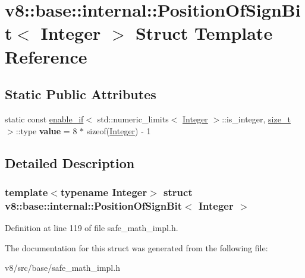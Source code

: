 \hypertarget{structv8_1_1base_1_1internal_1_1PositionOfSignBit}{}\section{v8\+:\+:base\+:\+:internal\+:\+:Position\+Of\+Sign\+Bit$<$ Integer $>$ Struct Template Reference}
\label{structv8_1_1base_1_1internal_1_1PositionOfSignBit}
\subsection*{Static Public Attributes}
\begin{DoxyCompactItemize}
\item 
\mbox{\label{structv8_1_1base_1_1internal_1_1PositionOfSignBit_ad29cf67660b8ffa1b8cc09181a5c779c}} 
static const \mbox{\hyperlink{structv8_1_1base_1_1internal_1_1enable__if}{enable\+\_\+if}}$<$ std\+::numeric\+\_\+limits$<$ \mbox{\hyperlink{classv8_1_1Integer}{Integer}} $>$\+::is\+\_\+integer, \mbox{\hyperlink{classsize__t}{size\+\_\+t}} $>$\+::type {\bfseries value} = 8 $\ast$ sizeof(\mbox{\hyperlink{classv8_1_1Integer}{Integer}}) -\/ 1
\end{DoxyCompactItemize}


\subsection{Detailed Description}
\subsubsection*{template$<$typename Integer$>$\newline
struct v8\+::base\+::internal\+::\+Position\+Of\+Sign\+Bit$<$ Integer $>$}



Definition at line 119 of file safe\+\_\+math\+\_\+impl.\+h.



The documentation for this struct was generated from the following file\+:\begin{DoxyCompactItemize}
\item 
v8/src/base/safe\+\_\+math\+\_\+impl.\+h\end{DoxyCompactItemize}
